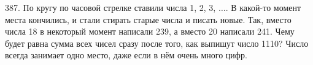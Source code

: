 387. По кругу по часовой стрелке ставили числа 1, 2, 3, $\ldots.$ В какой-то момент места кончились, и стали стирать старые числа и писать новые. Так, вместо числа 18 в некоторый момент написали 239, а вместо 20 написали 241. Чему будет равна сумма всех чисел сразу после того, как выпишут число 1110? Число всегда занимает одно место, даже если в нём очень много цифр.\\
